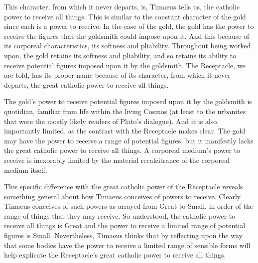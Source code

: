 This character, from which it never departs, is, Timaeus tells us, the catholic power to receive all things. This is similar to the constant character of the gold since each is a power to receive. In the case of the gold, the gold has the power to receive the figures that the goldsmith could impose upon it. And this because of its corporeal characteristics, its softness and pliability. Throughout being worked upon, the gold retains its softness and pliability, and so retains its ability to receive potential figures imposed upon it by the goldsmith. The Receptacle, we are told, has its proper name because of its character, from which it never departs, the great catholic power to receive all things.

The gold's power to receive potential figures imposed upon it by the goldsmith is quotidian, familiar from life within the living Cosmos (at least to the urbanites that were the mostly likely readers of Plato's dialogue). And it is also, importantly limited, as the contrast with the Receptacle makes clear. The gold may have the power to receive a range of potential figures, but it manifestly lacks the great catholic power to receive all things. A corporeal medium's power to receive is inexorably limited by the material recalcitrance of the corporeal medium itself. 

This specific difference with the great catholic power of the Receptacle reveals something general about how Timaeus conceives of powers to receive. Clearly Timaeus conceives of such powers as arrayed from Great to Small, in order of the range of things that they may receive. So understood, the catholic power to receive all things is Great and the power to receive a limited range of potential figures is Small. Nevertheless, Timaeus thinks that by reflecting upon the way that some bodies have the power to receive a limited range of sensible forms will help explicate the Receptacle's great catholic power to receive all things.


